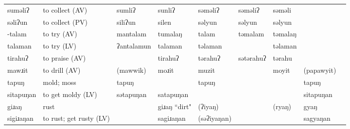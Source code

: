 \begin{landscape}
\begin{longtable}{*{9}{>{\raggedright\arraybackslash}p{}}}
\text{*}suməliʔ & to collect (AV) & sumliʔ & sunliʔ & səməliʔ & səməliʔ & səməli &  & \\
\text{*}səliʔun & to collect (PV) & siliʔun & silen & səlyun & səlyun & səlyun &  & \\
\text{*}-talam & to try (AV) & mantalam & tumalaŋ & talam & təmalam & təmalaŋ &  & \\
\text{*}talaman & to try (LV) & ʔantalamun & talaman & təlaman &  & təlaman &  & \\
\text{*}tirahuʔ & to praise (AV) &  & tirahuʔ & tərahuʔ & sətərahuʔ & tərahu &  & \\
\text{*}mawɹit & to drill (AV) & (mawwik) & moɹit & muzit &  & moyit & (papawyit) & \\
\text{*}tapuŋ & mold; moss & tapuŋ &  & tapuŋ &  &  & tapuŋ & \\
\text{*}sitapuŋan & to get moldy (LV) & sətapuŋan & satapuŋan &  &  &  & sitapuŋan & \\
\text{*}giɹaŋ & rust &  & giɹaŋ ``dirt" & (ʔiyaŋ) &  & (ryaŋ) & gyaŋ & \\
\text{*}sigiɹaŋan & to rust; get rusty (LV) &  & sagiɹaŋan & (səʔiyaŋan) &  &  & sagyaŋan & \\
\end{longtable}

\end{landscape}
